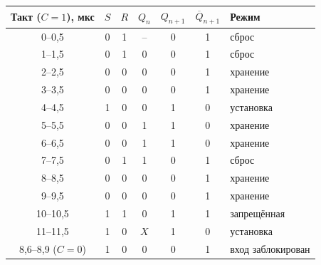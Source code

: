 \begin{tabular}{ccccccl}
\toprule
Такт ($C=1$), мкс & $S$ & $R$ & $Q_n$ & $Q_{n+1}$ & $\overline{Q}_{n+1}$ & Режим \\
\midrule
0--0{,}5 & 0 & 1 & -- & 0 & 1 & сброс \\
1--1{,}5 & 0 & 1 & 0 & 0 & 1 & сброс \\
2--2{,}5 & 0 & 0 & 0 & 0 & 1 & хранение \\
3--3{,}5 & 0 & 0 & 0 & 0 & 1 & хранение \\
4--4{,}5 & 1 & 0 & 0 & 1 & 0 & установка \\
5--5{,}5 & 0 & 0 & 1 & 1 & 0 & хранение \\
6--6{,}5 & 0 & 0 & 1 & 1 & 0 & хранение \\
7--7{,}5 & 0 & 1 & 1 & 0 & 1 & сброс \\
8--8{,}5 & 0 & 0 & 0 & 0 & 1 & хранение \\
9--9{,}5 & 0 & 0 & 0 & 0 & 1 & хранение \\
10--10{,}5 & 1 & 1 & 0 & 1 & 1 & запрещённая \\
11--11{,}5 & 1 & 0 & $X$ & 1 & 0 & установка \\
\midrule
8{,}6--8{,}9 ($C=0$) & 1 & 0 & 0 & 0 & 1 & вход заблокирован \\
\bottomrule
\end{tabular}